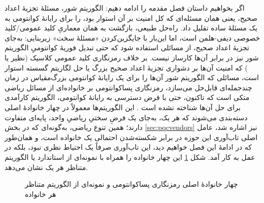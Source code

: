اگر بخواهیم داستان فصل مقدمه را ادامه دهیم: الگوریتم شور، مسئلهٔ تجزیهٔ اعداد صحیح، یعنی همان مسئله‌ای که کل امنیت  بر آن استوار بود، را برای رایانهٔ کوانتومی به یک مسئلهٔ ساده تقلیل داد. راه‌حل طبیعی، بازگشت به همان معماریِ کلید عمومی/کلید خصوصی دیفی-هلمن است، اما این‌بار با جایگزین‌کردن «مسئلهٔ سخت» زیربنایی: به‌جای تجزیهٔ اعداد صحیح، از مسائلی استفاده شود که حتی تبدیل فوریهٔ کوانتومیِ الگوریتم شور نیز در برابر آن‌ها کارساز نیست. بر خلاف رمزنگاری کلید عمومی کلاسیک (نظیر  یا ) که امنیت آن‌ها بر دشواری تجزیهٔ اعداد صحیح بزرگ یا حل لگاریتم گسسته استوار است، مسائلی که الگوریتم شور \Cite{shor1997} آن‌ها را برای یک رایانهٔ کوانتومی بزرگ‌مقیاس در زمان چندجمله‌ای قابل‌حل می‌سازد، رمزنگاری پساکوانتومی بر خانواده‌ای از مسائل ریاضی متکی است که تاکنون، حتی با فرض دسترسی به رایانهٔ کوانتومی، الگوریتم کارآمدی برای حل آن‌ها شناخته نشده است \Cite{djordjevic2025pqc}. این الگوریتم‌ها معمولاً در چهار خانوادهٔ اصلی دسته‌بندی می‌شوند که هر یک، به‌جای یک فرضِ سختیِ ریاضیِ واحد، پایه‌ای متفاوت دارند؛ همین تنوع ریاضی، به‌گونه‌ای که در بخش \ref{sec:pqcvendors} نیز اشاره شد، عامل اصلی تاب‌آوری این حوزه در برابر شکسته‌شدن احتمالی یک خانواده است، و همان‌طور که در ادامهٔ این فصل خواهیم دید، این تاب‌آوری صرفاً یک احتیاط نظری نبود، بلکه در عمل به کار آمد. شکل \ref{fig:pqcfamilies} این چهار خانواده را همراه با نمونه‌ای از استاندارد یا الگوریتم متناظر هر یک نشان می‌دهد.

\begin{figure}[htbp]
\centering
\caption{چهار خانوادهٔ اصلی رمزنگاری پساکوانتومی و نمونه‌ای از الگوریتم متناظر هر خانواده \Cite{djordjevic2025pqc}}
\label{fig:pqcfamilies}
\end{figure}

